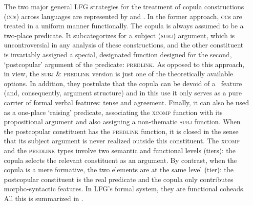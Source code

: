 \documentclass[output=paper,hidelinks]{langscibook}
\begin{document}
The two major general LFG strategies for the treatment of copula constructions (\textsc{cc}s) across languages are represented by \citet{ButtEtAl1999} and \citet{dalrympleetal04copular}. In the former approach, \textsc{cc}s are treated in a uniform manner functionally. The copula is always assumed to be a two-place predicate. It subcategorizes for a subject (\textsc{subj}) argument, which is uncontroversial in any analysis of these constructions, and the other constituent is invariably assigned a special, designated function designed for the second, `postcopular' argument of the predicate: \textsc{predlink}. As opposed to this approach, in  view, the \textsc{subj} \& \textsc{predlink} version is just one of the theoretically available options. In addition, they postulate that the copula can be devoid of a \PRED\ feature (and, consequently, argument structure) and in this use it only serves as a pure carrier of formal verbal features: tense and agreement. Finally, it can also be used as a one-place `raising' predicate, associating the \textsc{xcomp} function with its propositional argument and also assigning a non-thematic \textsc{subj} function. When the postcopular constituent has the \textsc{predlink} function, it is closed in the sense that its subject argument is never realized outside this constituent. The \textsc{xcomp} and the \textsc{predlink} types involve two semantic and functional levels (tiers): the copula selects the relevant constituent as an argument. By contrast, when the copula is a mere formative, the two elements are at the same level (tier): the postcopular constituent is the real predicate and the copula only contributes morpho-syntactic features. In LFG's formal system, they are functional coheads. All this is summarized in .


\begin{table}
\caption{Three types of copular constructions, \citet{dalrympleetal04copular}}
\label{tab:FinnoUgric:2}
\end{table}
\end{document}
